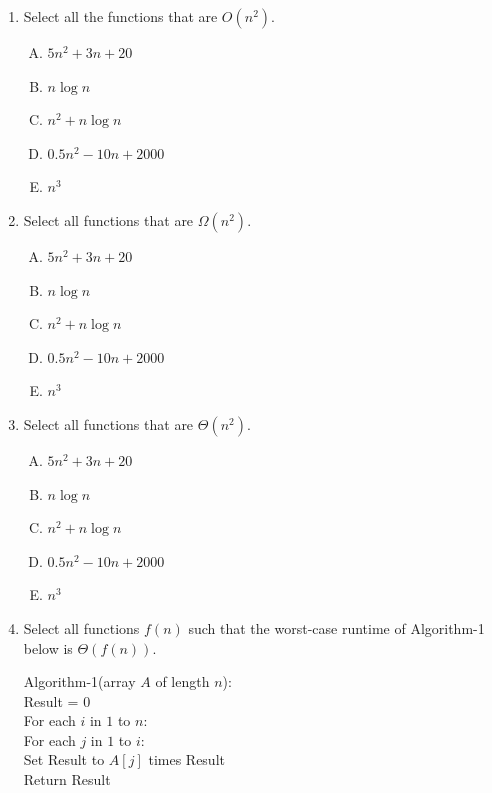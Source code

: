 \documentclass[11pt]{article}
\begin{document}
\begin{enumerate}
\item Select all the functions that are $O(n^2)$.
\begin{enumerate}[A.]
    \item $5n^2 + 3n + 20$
    \item $n \log n$
    \item $n^2 + n \log n$
    \item $0.5 n^2 - 10 n + 2000$
    \item $n^3$

\end{enumerate}

\item Select all functions that are $\Omega(n^2)$.

\begin{enumerate}[A.]
    \item $5n^2 + 3n + 20$
    \item $n \log n$
    \item $n^2 + n \log n$
    \item $0.5 n^2 - 10 n + 2000$
    \item $n^3$

\end{enumerate}

\item Select all functions that are $\Theta(n^2)$.

\begin{enumerate}[A.]
    \item $5n^2 + 3n + 20$
    \item $n \log n$
    \item $n^2 + n \log n$
    \item $0.5 n^2 - 10 n + 2000$
    \item $n^3$

\end{enumerate}

\item Select all functions $f(n)$ such that the worst-case runtime of
Algorithm-1 below is $\Theta(f(n))$.

    \begin{algo}
    Algorithm-1(array $A$ of length $n$):\+\\
    Result = 0\\
    For each $i$ in $1$ to $n$:\+\\
    For each $j$ in $1$ to $i$:\+\\
    Set Result to $A[j]$ times Result\-\- \\
    Return Result\\
    \end{algo} 


\end{enumerate}
\end{document}
